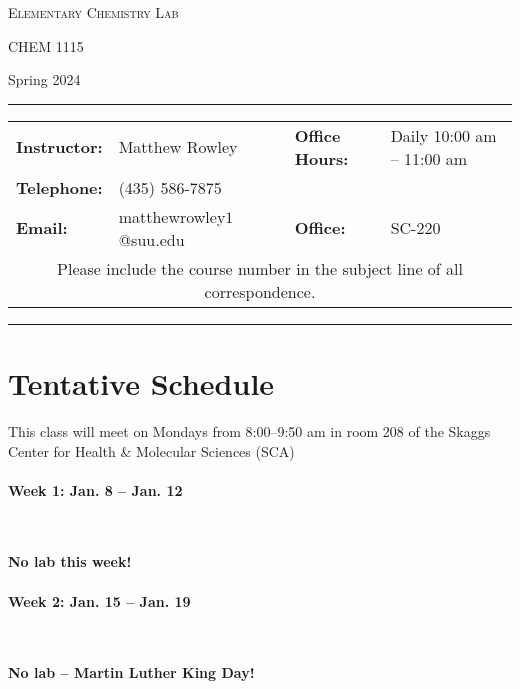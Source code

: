 \documentclass[12pt, letterpaper]{article}
\begin{document}
\begin{center}
	{\Large \textsc{Elementary Chemistry Lab}}

	CHEM 1115
\end{center}

\begin{center}
	{\large Spring 2024}
\end{center}
\begin{center}
	\rule{0.99\textwidth}{0.4pt}
	\begin{tabular}{llcll}
		\textbf{Instructor:} & Matthew Rowley           &  & \textbf{Office Hours:} & Daily 10:00 am -- 11:00 am \\
		\textbf{Telephone:}  & (435) 586-7875           &  &                        &                            \\
		\textbf{Email:}      & matthewrowley$1$@suu.edu &  & \textbf{Office:}       & SC-220                     \\
		\multicolumn{5}{c}{Please include the course number in the subject line of all correspondence.}
	\end{tabular}
	\rule{0.99\textwidth}{0.4pt}
\end{center}

\section*{Tentative Schedule}
This class will meet on Mondays from 8:00--9:50 am in room 208 of the Skaggs Center for Health \& Molecular Sciences (SCA)

\paragraph{Week 1: Jan. 8 -- Jan. 12}~

\textbf{No lab this week!}

\paragraph{Week 2: Jan. 15 -- Jan. 19}~

\textbf{No lab -- Martin Luther King Day!}
\end{document}

